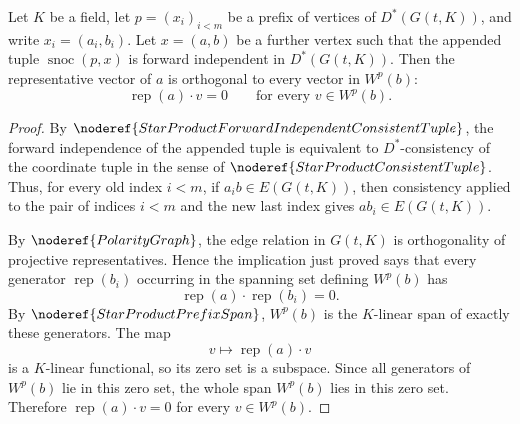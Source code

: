 \begin{helper}
Let \(K\) be a field, let \(p=(x_i)_{i<m}\) be a prefix of vertices of
\(D^*(G(t,K))\), and write \(x_i=(a_i,b_i)\).  Let
\(x=(a,b)\) be a further vertex such that the appended tuple
\(\operatorname{snoc}(p,x)\) is forward independent in \(D^*(G(t,K))\).
Then the representative vector of \(a\) is orthogonal to every vector in
\(W^p(b)\):
\[
  \operatorname{rep}(a)\cdot v=0
  \qquad\text{for every }v\in W^p(b).
\]
\end{helper}
\begin{proof}
By \(\noderef{StarProductForwardIndependentConsistentTuple}\), the forward
independence of the appended tuple is equivalent to
\(D^*\)-consistency of the coordinate tuple in the sense of
\(\noderef{StarProductConsistentTuple}\).  Thus, for every old index \(i<m\),
if \(a_i b\in E(G(t,K))\), then consistency applied to the pair of indices
\(i<m\) and the new last index gives \(a b_i\in E(G(t,K))\).

By \(\noderef{PolarityGraph}\), the edge relation in \(G(t,K)\) is
orthogonality of projective representatives.  Hence the implication just
proved says that every generator \(\operatorname{rep}(b_i)\) occurring in
the spanning set defining \(W^p(b)\) has
\[
  \operatorname{rep}(a)\cdot \operatorname{rep}(b_i)=0.
\]
By \(\noderef{StarProductPrefixSpan}\), \(W^p(b)\) is the \(K\)-linear span
of exactly these generators.  The map
\[
  v\longmapsto \operatorname{rep}(a)\cdot v
\]
is a \(K\)-linear functional, so its zero set is a subspace.  Since all
generators of \(W^p(b)\) lie in this zero set, the whole span \(W^p(b)\)
lies in this zero set.  Therefore
\(\operatorname{rep}(a)\cdot v=0\) for every \(v\in W^p(b)\).
\end{proof}
